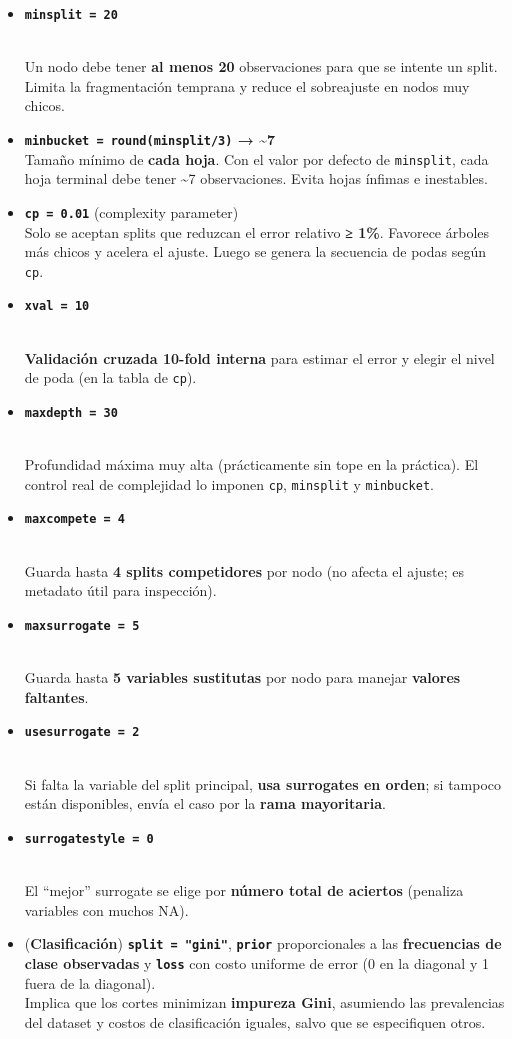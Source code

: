 \documentclass[
]{article}
\begin{document}
\begin{itemize}
\item
  \textbf{\texttt{minsplit\ =\ 20}}\strut \\
  Un nodo debe tener \textbf{al menos 20} observaciones para que se
  intente un split. Limita la fragmentación temprana y reduce el
  sobreajuste en nodos muy chicos.
\item
  \textbf{\texttt{minbucket\ =\ round(minsplit/3)} → \textasciitilde7}\\
  Tamaño mínimo de \textbf{cada hoja}. Con el valor por defecto de
  \texttt{minsplit}, cada hoja terminal debe tener \textasciitilde7
  observaciones. Evita hojas ínfimas e inestables.
\item
  \textbf{\texttt{cp\ =\ 0.01}} (complexity parameter)\\
  Solo se aceptan splits que reduzcan el error relativo \textbf{≥ 1\%}.
  Favorece árboles más chicos y acelera el ajuste. Luego se genera la
  secuencia de podas según \texttt{cp}.
\item
  \textbf{\texttt{xval\ =\ 10}}\strut \\
  \textbf{Validación cruzada 10-fold interna} para estimar el error y
  elegir el nivel de poda (en la tabla de \texttt{cp}).
\item
  \textbf{\texttt{maxdepth\ =\ 30}}\strut \\
  Profundidad máxima muy alta (prácticamente sin tope en la práctica).
  El control real de complejidad lo imponen \texttt{cp},
  \texttt{minsplit} y \texttt{minbucket}.
\item
  \textbf{\texttt{maxcompete\ =\ 4}}\strut \\
  Guarda hasta \textbf{4 splits competidores} por nodo (no afecta el
  ajuste; es metadato útil para inspección).
\item
  \textbf{\texttt{maxsurrogate\ =\ 5}}\strut \\
  Guarda hasta \textbf{5 variables sustitutas} por nodo para manejar
  \textbf{valores faltantes}.
\item
  \textbf{\texttt{usesurrogate\ =\ 2}}\strut \\
  Si falta la variable del split principal, \textbf{usa surrogates en
  orden}; si tampoco están disponibles, envía el caso por la
  \textbf{rama mayoritaria}.
\item
  \textbf{\texttt{surrogatestyle\ =\ 0}}\strut \\
  El ``mejor'' surrogate se elige por \textbf{número total de aciertos}
  (penaliza variables con muchos NA).
\item
  (\textbf{Clasificación}) \textbf{\texttt{split\ =\ "gini"}},
  \textbf{\texttt{prior}} proporcionales a las \textbf{frecuencias de
  clase observadas} y \textbf{\texttt{loss}} con costo uniforme de error
  (0 en la diagonal y 1 fuera de la diagonal).\\
  Implica que los cortes minimizan \textbf{impureza Gini}, asumiendo las
  prevalencias del dataset y costos de clasificación iguales, salvo que
  se especifiquen otros.
\end{itemize}
\end{document}

